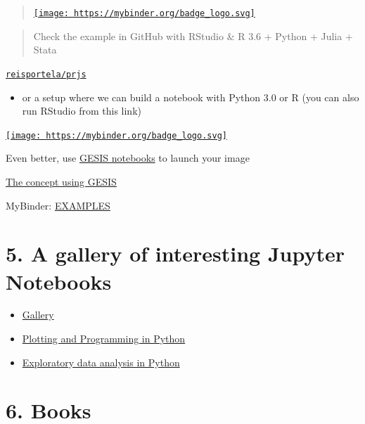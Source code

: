 \documentclass[
  12pt,
]{article}
\providecommand{\tightlist}{%
  \setlength{\itemsep}{0pt}\setlength{\parskip}{0pt}}
\begin{document}
\begin{quote}
\href{https://mybinder.org/v2/gh/reisportela/R_Training/HEAD?urlpath=lab}{\texttt{[image: https://mybinder.org/badge\_logo.svg]}}
\end{quote}

\begin{quote}
Check the example in GitHub with RStudio \& R 3.6 + Python + Julia +
Stata
\end{quote}

\href{https://github.com/reisportela/prjs}{\texttt{reisportela/prjs}}

\begin{itemize}
\tightlist
\item
  or a setup where we can build a notebook with Python 3.0 or R (you can
  also run RStudio from this link)
\end{itemize}

\href{https://mybinder.org/v2/gh/reisportela/prjs/master}{\texttt{[image: https://mybinder.org/badge\_logo.svg]}}

Even better, use \href{https://notebooks.gesis.org/hub/home}{GESIS
notebooks} to launch your image

\href{https://notebooks.gesis.org/user/reisportela@gmail.com}{The
concept using GESIS}

MyBinder: \href{https://github.com/binder-examples}{EXAMPLES}

\hypertarget{a-gallery-of-interesting-jupyter-notebooks}{%
\section{5. A gallery of interesting Jupyter
Notebooks}\label{a-gallery-of-interesting-jupyter-notebooks}}

\begin{itemize}
\item
  \href{https://github.com/jupyter/jupyter/wiki/A-gallery-of-interesting-Jupyter-Notebooks}{Gallery}
\item
  \href{https://swcarpentry.github.io/python-novice-gapminder/}{Plotting
  and Programming in Python}
\item
  \href{https://nbviewer.jupyter.org/github/Tanu-N-Prabhu/Python/blob/master/Exploratory_data_Analysis.ipynb}{Exploratory
  data analysis in Python}
\end{itemize}

\hypertarget{books}{%
\section{6. Books}\label{books}}
\end{document}
